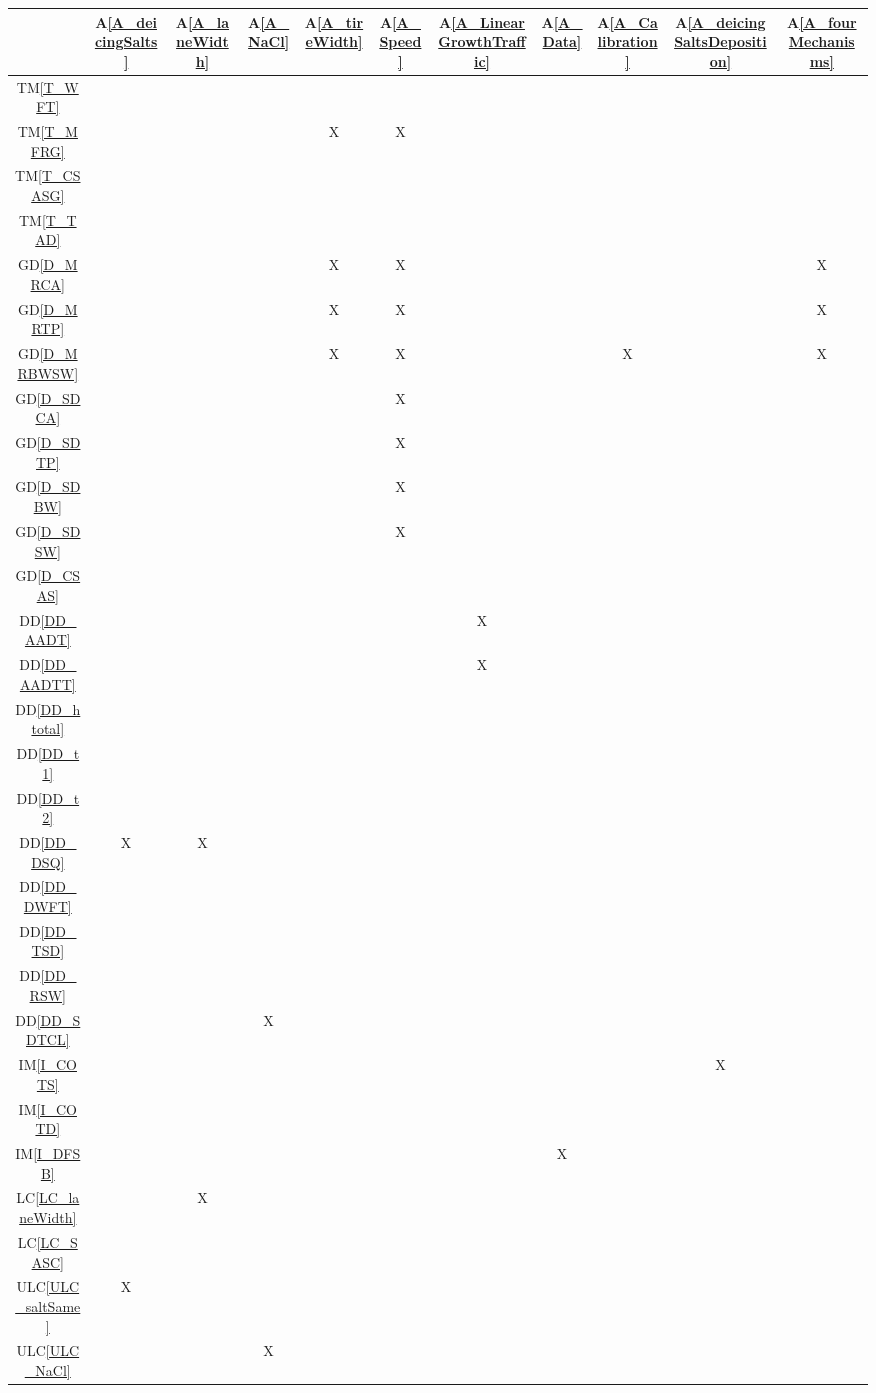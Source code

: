 \documentclass[12pt]{article}
\newcommand{\dref}[1]{GD\ref{#1}}
\newcommand{\ddref}[1]{DD\ref{#1}}
\newcommand{\tref}[1]{TM\ref{#1}}
\newcommand{\aref}[1]{A\ref{#1}}
\newcommand{\iref}[1]{IM\ref{#1}}
\newcommand{\lcref}[1]{LC\ref{#1}}
\newcommand{\ulcref}[1]{ULC\ref{#1}}
\begin{document}
\noindent
\begin{table}[H]
\centering
\begin{tabular}{|c|c|c|c|c|c|c|c|c|c|c|}
\hline
	& \aref{A_deicingSalts}& \aref{A_laneWidth}& \aref{A_NaCl} & \aref{A_tireWidth} & \aref{A_Speed} & \aref{A_LinearGrowthTraffic} & \aref{A_Data} & \aref{A_Calibration} & \aref{A_deicingSaltsDeposition} &\aref{A_fourMechanisms}\\
\hline
\tref{T_WFT}       & & & & & &  & & & &  \\ \hline
\tref{T_MFRG}      & & & & X & X & &  & & & \\ \hline
\tref{T_CSASG}        & & & & &  & &  & & &\\ \hline
\tref{T_TAD}        & & & & &  & & && &\\ \hline
\dref{D_MRCA}          & & & & X & X  & &  & & &X \\ \hline
\dref{D_MRTP}          & & & & X & X  & &  & & &X \\ \hline
\dref{D_MRBWSW}          & & & & X & X  & &  & X  & &X\\ \hline
\dref{D_SDCA}            & & & & & X  & &  & & & \\ \hline
\dref{D_SDTP}            & & & & & X  & &  & & & \\ \hline
\dref{D_SDBW}            & & & & & X  & &  && &  \\ \hline
\dref{D_SDSW}            & & & & & X  & &  && &  \\ \hline
\dref{D_CSAS}       & & & & &  & & && & \\ \hline
\ddref{DD_AADT}  & & & & & & X &  && & \\ \hline
\ddref{DD_AADTT}  & & & & &  & X & & & &\\ \hline
\ddref{DD_htotal}  & & & & & & &  && & \\ \hline
\ddref{DD_t1}  & & & & & &  & && & \\ \hline
\ddref{DD_t2}  & & & & & &  & & & &\\ \hline
\ddref{DD_DSQ}   & X & X & &   &  & & & & & \\ \hline
\ddref{DD_DWFT}    & & & & & &  & && &\\ \hline
\ddref{DD_TSD}    & & & & & & &  && & \\ \hline
\ddref{DD_RSW}    & & & & & & &  && & \\ \hline
\ddref{DD_SDTCL}    & & & X &  & & & && &\\ \hline
\iref{I_COTS}       & & & & & & & & & X & \\ \hline
\iref{I_COTD}       & & & & & &  & && & \\ \hline
\iref{I_DFSB}       & & & & &  & & X & & &\\ \hline
\lcref{LC_laneWidth}     & & X & &  & & &  & && \\ \hline
\lcref{LC_SASC}   & & & & & &  & && & \\ \hline
\ulcref{ULC_saltSame}   & X & & &  && & & &  &\\ \hline
\ulcref{ULC_NaCl}   & & & X &  & & && &  & \\ \hline


\end{tabular}
\end{table}
\end{document}
